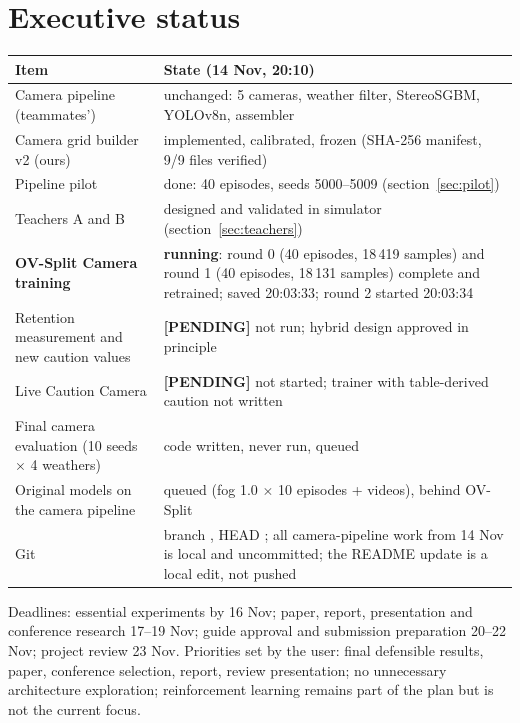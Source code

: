 \documentclass[10.5pt,a4paper]{article}
\newcommand{\code}[1]{\texttt{\detokenize{#1}}}
\newcommand{\tbd}{\textbf{[PENDING]}}
\begin{document}
\section{Executive status}
\begin{center}\small\begin{tabular}{@{}p{5.2cm}p{11cm}@{}}\toprule
Item & State (14 Nov, 20:10)\\\midrule
Camera pipeline (teammates') & unchanged: 5 cameras, weather filter, StereoSGBM, YOLOv8n, assembler\\
Camera grid builder v2 (ours) & implemented, calibrated, frozen (SHA-256 manifest, 9/9 files verified)\\
Pipeline pilot & done: 40 episodes, seeds 5000--5009 (section~\ref{sec:pilot})\\
Teachers A and B & designed and validated in simulator (section~\ref{sec:teachers})\\
\textbf{OV-Split Camera training} & \textbf{running}: round 0 (40 episodes, 18\,419 samples) and round 1 (40 episodes, 18\,131 samples) complete and retrained; \code{iter_1.pt} saved 20:03:33; round 2 started 20:03:34\\
Retention measurement and new caution values & \tbd{} not run; hybrid design approved in principle\\
Live Caution Camera & \tbd{} not started; trainer with table-derived caution not written\\
Final camera evaluation (10 seeds $\times$ 4 weathers) & code written, never run, queued\\
Original models on the camera pipeline & queued (fog 1.0 $\times$ 10 episodes + videos), behind OV-Split\\
Git & branch \code{cleaned-latest}, HEAD \code{4d45920}; all camera-pipeline work from 14 Nov is local and uncommitted; the README update is a local edit, not pushed\\\bottomrule\end{tabular}\end{center}
Deadlines: essential experiments by 16 Nov; paper, report, presentation and conference research 17--19 Nov; guide approval and submission preparation 20--22 Nov; project review 23 Nov. Priorities set by the user: final defensible results, paper, conference selection, report, review presentation; no unnecessary architecture exploration; reinforcement learning remains part of the plan but is not the current focus.
\end{document}
